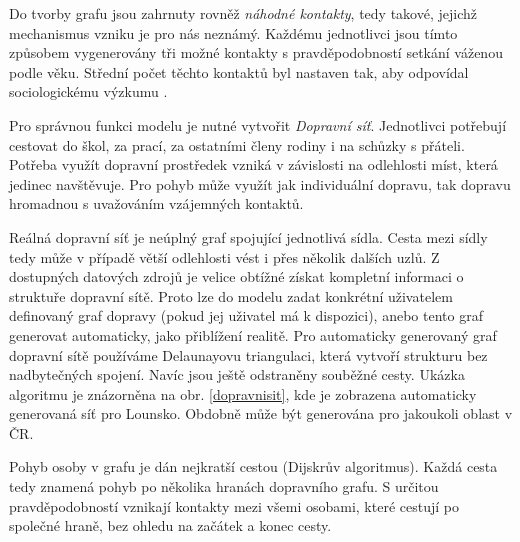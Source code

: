 Do tvorby grafu jsou zahrnuty rovněž \emph{náhodné kontakty}, tedy takové, jejichž mechanismus vzniku je pro nás neznámý. Každému jednotlivci jsou tímto způsobem vygenerovány tři možné kontakty s pravděpodobností setkání váženou podle věku. Střední počet těchto kontaktů byl nastaven tak, aby odpovídal sociologickému výzkumu \cite{Prem_etal2017}.

Pro správnou funkci modelu je nutné vytvořit \emph{Dopravní síť}. Jednotlivci potřebují cestovat do škol, za prací, za ostatními členy rodiny i na schůzky s přáteli. Potřeba využít dopravní prostředek vzniká v závislosti na odlehlosti míst, která jedinec navštěvuje. Pro pohyb může využít jak individuální dopravu, tak dopravu hromadnou s uvažováním vzájemných kontaktů. 

Reálná dopravní síť je neúplný graf spojující jednotlivá sídla. Cesta mezi sídly tedy může v případě větší odlehlosti vést i přes několik dalších uzlů. Z dostupných datových zdrojů je velice obtížné získat kompletní informaci o struktuře dopravní sítě. Proto lze do modelu zadat konkrétní uživatelem definovaný graf dopravy (pokud jej uživatel má k dispozici), anebo tento graf generovat automaticky, jako přiblížení realitě. Pro automaticky generovaný graf dopravní sítě používáme Delaunayovu triangulaci, která vytvoří strukturu bez nadbytečných spojení. Navíc jsou ještě odstraněny souběžné cesty. Ukázka algoritmu je znázorněna na
obr. \ref{dopravnisit}, kde je zobrazena automaticky generovaná síť pro Lounsko. Obdobně může být generována pro jakoukoli oblast v ČR. 


Pohyb osoby v grafu je dán nejkratší cestou (Dijskrův algoritmus). Každá cesta tedy znamená pohyb po několika hranách dopravního grafu. S určitou pravděpodobností vznikají kontakty mezi všemi osobami, které cestují po společné hraně, bez ohledu na začátek a konec cesty. 





